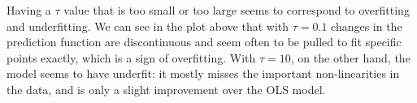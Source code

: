 \documentclass[12 pt]{article}        	%
\begin{document}
Having a $ \tau $ value that is too small or too large seems to correspond to overfitting and underfitting. We can see in the plot above 
that with $ \tau = 0.1 $ changes in the prediction function are discontinuous and seem often to be pulled to fit specific points exactly,
which is a sign of overfitting. With $ \tau = 10 $, on the other hand, the model seems to have underfit: it mostly misses 
the important non-linearities in the data, and is only a slight improvement over the OLS model.
\end{document}

